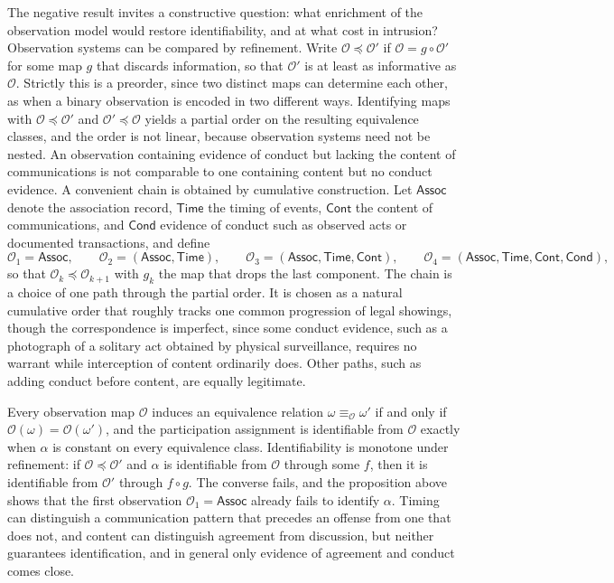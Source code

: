 \documentclass[11pt]{article}
\theoremstyle{definition}
\theoremstyle{remark}
\begin{document}
The negative result invites a constructive question: what enrichment of the observation model would restore identifiability, and at what cost in intrusion? Observation systems can be compared by refinement. Write $\mathcal{O} \preceq \mathcal{O}'$ if $\mathcal{O} = g \circ \mathcal{O}'$ for some map $g$ that discards information, so that $\mathcal{O}'$ is at least as informative as $\mathcal{O}$. Strictly this is a preorder, since two distinct maps can determine each other, as when a binary observation is encoded in two different ways. Identifying maps with $\mathcal{O} \preceq \mathcal{O}'$ and $\mathcal{O}' \preceq \mathcal{O}$ yields a partial order on the resulting equivalence classes, and the order is not linear, because observation systems need not be nested. An observation containing evidence of conduct but lacking the content of communications is not comparable to one containing content but no conduct evidence. A convenient chain is obtained by cumulative construction. Let $\mathsf{Assoc}$ denote the association record, $\mathsf{Time}$ the timing of events, $\mathsf{Cont}$ the content of communications, and $\mathsf{Cond}$ evidence of conduct such as observed acts or documented transactions, and define
\[
\mathcal{O}_1 = \mathsf{Assoc}, \qquad \mathcal{O}_2 = (\mathsf{Assoc},\mathsf{Time}), \qquad \mathcal{O}_3 = (\mathsf{Assoc},\mathsf{Time},\mathsf{Cont}), \qquad \mathcal{O}_4 = (\mathsf{Assoc},\mathsf{Time},\mathsf{Cont},\mathsf{Cond}),
\]
so that $\mathcal{O}_k \preceq \mathcal{O}_{k+1}$ with $g_k$ the map that drops the last component. The chain is a choice of one path through the partial order. It is chosen as a natural cumulative order that roughly tracks one common progression of legal showings, though the correspondence is imperfect, since some conduct evidence, such as a photograph of a solitary act obtained by physical surveillance, requires no warrant while interception of content ordinarily does. Other paths, such as adding conduct before content, are equally legitimate.

Every observation map $\mathcal{O}$ induces an equivalence relation $\omega \equiv_{\mathcal{O}} \omega'$ if and only if $\mathcal{O}(\omega) = \mathcal{O}(\omega')$, and the participation assignment is identifiable from $\mathcal{O}$ exactly when $\alpha$ is constant on every equivalence class. Identifiability is monotone under refinement: if $\mathcal{O} \preceq \mathcal{O}'$ and $\alpha$ is identifiable from $\mathcal{O}$ through some $f$, then it is identifiable from $\mathcal{O}'$ through $f \circ g$. The converse fails, and the proposition above shows that the first observation $\mathcal{O}_1 = \mathsf{Assoc}$ already fails to identify $\alpha$. Timing can distinguish a communication pattern that precedes an offense from one that does not, and content can distinguish agreement from discussion, but neither guarantees identification, and in general only evidence of agreement and conduct comes close.
\end{document}
